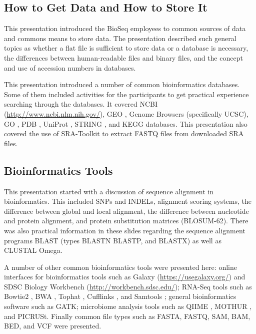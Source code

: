 \documentclass{report}
\begin{document}
\subsection{How to Get Data and How to Store It}
This presentation introduced the BioSeq employees to common sources of data and commons means to store data. The presentation described such general topics as whether a flat file is sufficient to store data or a database is necessary, the differences between human-readable files and binary files, and the concept and use of accession numbers in databases.


This presentation introduced a number of common bioinformatics databases. Some of them included activities for the participants to get practical experience searching through the databases. It covered NCBI (\url{http://www.ncbi.nlm.nih.gov/}), GEO \cite{edgar2002gene}, Genome Browsers (specifically UCSC), GO \cite{ashburner2000gene}, PDB \cite{berman2000protein}, UniProt \cite{apweiler2004uniprot}, STRING \cite{von2003string}, and KEGG \cite{ogata1999kegg} databases. This presentation also covered the use of SRA-Toolkit \cite{leinonen2010sequence} to extract FASTQ files from downloaded SRA files.

\subsection{Bioinformatics Tools}
This presentation started with a discussion of sequence alignment in bioinformatics. This included SNPs and INDELs, alignment scoring systems, the difference between global and local alignment, the difference between nucleotide and protein alignment, and protein substitution matrices (BLOSUM-62). There was also practical information in these slides regarding the sequence alignment programs BLAST (types BLASTN BLASTP, and BLASTX) as well as CLUSTAL Omega.

A number of other common bioinformatics tools were presented here: online interfaces for bioinformatics tools such as Galaxy (\url{https://usegalaxy.org/}) and SDSC Biology Workbench (\url{http://workbench.sdsc.edu/}); RNA-Seq tools such as Bowtie2 \cite{langmead2012fast}, BWA \cite{li2009fast}, Tophat \cite{trapnell2009tophat}, Cufflinks \cite{trapnell2012differential}, and Samtools \cite{li2009sequence}; general bioinformatics software such as GATK; microbiome analysis tools such as QIIME \cite{caporaso2010qiime}, MOTHUR \cite{schloss2009introducing}, and PICRUSt. Finally common file types such as FASTA, FASTQ, SAM, BAM, BED, and VCF were presented.
\end{document}
